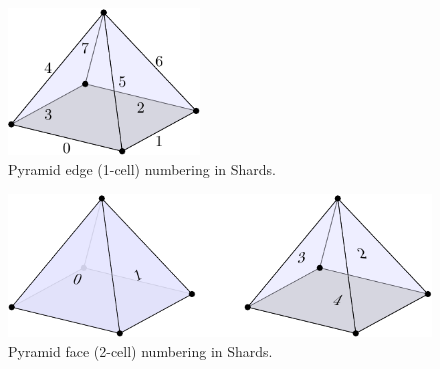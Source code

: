 \documentclass[pdf,12pt,relaxed]{SANDreport}
\begin{document}
\begin{figure}[ht]
 \begin{center}
    \includegraphics[width=2.0in]{topo_figs/pyr_edge.pdf}
  \end{center}
  \caption{Pyramid edge (1-cell) numbering in Shards.}
 \label{fig:pyr2}
\end{figure}
  
\begin{figure}[ht]
 \begin{center}
    \includegraphics[width=4.5in]{topo_figs/pyr_face.pdf}
 \end{center}
 \caption{Pyramid face (2-cell) numbering in Shards.}
 \label{fig:pyr3}
\end{figure}


\end{document}
